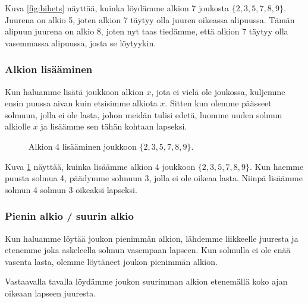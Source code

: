 Kuva \ref{fig:bihets} näyttää, kuinka löydämme alkion 7
joukosta $\{2,3,5,7,8,9\}$.
Juurena on alkio 5, joten alkion 7 täytyy olla juuren
oikeassa alipuussa.
Tämän alipuun juurena on alkio 8,
joten nyt taas tiedämme, että alkion 7 täytyy olla
vasemmassa alipuussa, josta se löytyykin.

\subsubsection{Alkion lisääminen}

Kun haluamme lisätä joukkoon alkion $x$,
jota ei vielä ole joukossa, kuljemme ensin
puussa aivan kuin etsisimme alkiota $x$.
Sitten kun olemme päässeet solmuun,
jolla ei ole lasta, johon meidän tulisi edetä,
luomme uuden solmun alkiolle $x$ ja lisäämme
sen tähän kohtaan lapseksi.

\begin{figure}
\center
{}
\caption{Alkion 4 lisääminen joukkoon $\{2,3,5,7,8,9\}$.}
\label{fig:bihpu2}
\end{figure}

Kuva \ref{fig:bihpu2} näyttää, kuinka lisäämme alkion 4
joukkoon $\{2,3,5,7,8,9\}$.
Kun haemme puusta solmua 4, päädymme solmuun 3,
jolla ei ole oikeaa lasta.
Niinpä lisäämme solmun 4 solmun 3 oikeaksi lapseksi.

\subsubsection{Pienin alkio / suurin alkio}

Kun haluamme löytää joukon pienimmän alkion,
lähdemme liikkeelle juuresta ja etenemme joka askeleella
solmun vasempaan lapseen.
Kun solmulla ei ole enää vasenta lasta,
olemme löytäneet joukon pienimmän alkion.

Vastaavalla tavalla löydämme joukon suurimman alkion
etenemällä koko ajan oikeaan lapseen juuresta.


